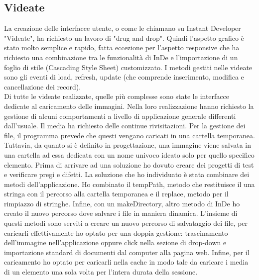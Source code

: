 \subsection{Videate}
La creazione delle interfacce utente, o come le chiamano su Instant Developer "Videate", ha richiesto un lavoro di "drug and drop". Quindi l'aspetto grafico è stato molto semplice e rapido, fatta eccezione per l'aspetto responsive che ha richiesto una combinazione tra le funzionalità di InDe e l'importazione di un foglio di stile (Cascading Style Sheet) customizzato.
I metodi gestiti nelle videate sono gli eventi di load, refresh, update (che comprende inserimento, modifica e cancellazione dei record).\\

Di tutte le videate realizzate, quelle più complesse sono state le interfacce dedicate al caricamento delle immagini. Nella loro realizzazione hanno richiesto la gestione di alcuni comportamenti a livello di applicazione generale differenti dall'usuale.
Il media ha richiesto delle continue rivisitazioni. Per la gestione dei file, il programma prevede che questi vengano caricati in una cartella temporanea. Tuttavia, da quanto si è definito in progettazione, una immagine viene salvata in una cartella ad essa dedicata con un nome univoco ideato solo per quello specifico elemento. 
Prima di arrivare ad una soluzione ho dovuto creare dei progetti di test e verificare pregi e difetti. La soluzione che ho individuato è stata combinare dei metodi dell'applicazione. Ho combinato il tempPath, metodo che restituisce il una stringa con il percorso alla cartella temporanea e il replace, metodo per il rimpiazzo di stringhe. Infine, con un makeDirectory, altro metodo di InDe ho creato il nuovo percorso dove salvare i file in maniera dinamica. 
L'insieme di questi metodi sono serviti a creare un nuovo percorso di salvataggio dei file, per caricarli effettivamente ho optato per una doppia gestione: trascinamento dell'immagine nell'applicazione oppure click nella sezione di drop-down e importazione standard di documenti dal computer alla pagina web. Infine, per il caricamento ho optato per caricarli nella cache in modo tale da caricare i media di un elemento una sola volta per l'intera durata della sessione.\\

